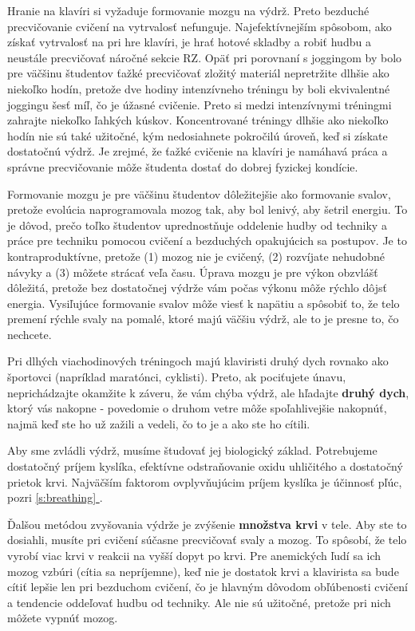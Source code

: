 \documentclass[11pt,a4paper]{book}
\newcommand*{\fullref}[1]{\hyperref[{#1}]{\ref*{#1} \nameref*{#1}}} %
\begin{document}
Hranie na klavíri si vyžaduje formovanie mozgu na výdrž. Preto bezduché precvičovanie cvičení na vytrvalosť nefunguje. Najefektívnejším spôsobom, ako získať vytrvalosť na pri hre klavíri, je hrať hotové skladby a robiť hudbu a neustále precvičovať náročné sekcie RZ. Opäť pri porovnaní s joggingom by bolo pre väčšinu študentov ťažké precvičovať zložitý materiál nepretržite dlhšie ako niekoľko hodín, pretože dve hodiny intenzívneho tréningu by boli ekvivalentné joggingu šesť míľ, čo je úžasné cvičenie. Preto si medzi intenzívnymi tréningmi zahrajte niekoľko ľahkých kúskov. Koncentrované tréningy dlhšie ako niekoľko hodín nie sú také užitočné, kým nedosiahnete pokročilú úroveň, keď si získate dostatočnú výdrž. Je zrejmé, že ťažké cvičenie na klavíri je namáhavá práca a správne precvičovanie môže študenta dostať do dobrej fyzickej kondície.

Formovanie mozgu je pre väčšinu študentov dôležitejšie ako formovanie svalov, pretože evolúcia naprogramovala mozog tak, aby bol lenivý, aby šetril energiu. To je dôvod, prečo toľko študentov uprednostňuje oddelenie hudby od techniky a práce pre techniku ​​pomocou cvičení a bezduchých opakujúcich sa postupov. Je to kontraproduktívne, pretože (1) mozog nie je cvičený, (2) rozvíjate nehudobné návyky a (3) môžete strácať veľa času. Úprava mozgu je pre výkon obzvlášť dôležitá, pretože bez dostatočnej výdrže vám počas výkonu môže rýchlo dôjsť energia. Vysiľujúce formovanie svalov môže viesť k napätiu a spôsobiť to, že telo premení rýchle svaly na pomalé, ktoré majú väčšiu výdrž, ale to je presne to, čo nechcete.

Pri dlhých viachodinových tréningoch majú klaviristi druhý dych rovnako ako športovci (napríklad maratónci, cyklisti). Preto, ak pociťujete únavu, neprichádzajte okamžite k záveru, že vám chýba výdrž, ale hľadajte \textbf{druhý dych}, ktorý vás nakopne - povedomie o druhom vetre môže spoľahlivejšie nakopnúť, najmä keď ste ho už zažili a vedeli, čo to je a ako ste ho cítili.

Aby sme zvládli výdrž, musíme študovať jej biologický základ. Potrebujeme dostatočný príjem kyslíka, efektívne odstraňovanie oxidu uhličitého a dostatočný prietok krvi. Najväčším faktorom ovplyvňujúcim príjem kyslíka je účinnosť pľúc, pozri \fullref{s:breathing}.

Ďalšou metódou zvyšovania výdrže je zvýšenie \textbf{množstva krvi} v tele. Aby ste to dosiahli, musíte pri cvičení súčasne precvičovať svaly a mozog. To spôsobí, že telo vyrobí viac krvi v reakcii na vyšší dopyt po krvi. Pre anemických ľudí sa ich mozog vzbúri (cítia sa nepríjemne), keď nie je dostatok krvi a klavirista sa bude cítiť lepšie len pri bezduchom cvičení, čo je hlavným dôvodom obľúbenosti cvičení a tendencie oddeľovať hudbu od techniky. Ale nie sú užitočné, pretože pri nich môžete vypnúť mozog.  
\end{document}
